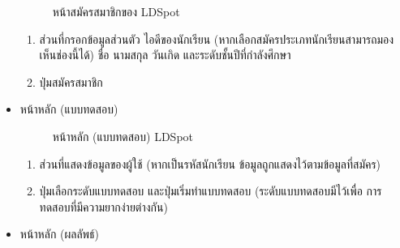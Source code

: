 \documentclass[12pt,oneside,openright,a4paper]{cpe-thai-project}
\begin{document}
\begin{itemize}
\begin{figure}[!ht]
    \caption{หน้าสมัครสมาชิกของ LDSpot}\label{fig:register3}
  \end{figure}
  \begin{enumerate}
    \item ส่วนที่กรอกข้อมูลส่วนตัว ไอดีของนักเรียน (หากเลือกสมัครประเภทนักเรียนสามารถมองเห็นช่องนี้ได้) ชื่อ นามสกุล วันเกิด และระดับชั้นปีที่กำลังศึกษา
    \item ปุ่มสมัครสมาชิก
  \end{enumerate}
  \newpage
 

  \item หน้าหลัก (แบบทดสอบ)
  \begin{figure}[!ht]\centering
    \setlength{\fboxrule}{0.2mm} %
    \setlength{\fboxsep}{1cm}
    \caption{หน้าหลัก (แบบทดสอบ) LDSpot}\label{fig:system}
  \end{figure}
  \begin{enumerate}
    \item ส่วนที่แสดงข้อมูลของผู้ใช้ (หากเป็นรหัสนักเรียน ข้อมูลถูกแสดงไว้ตามข้อมูลที่สมัคร)
    \item ปุ่มเลือกระดับแบบทดสอบ และปุ่มเริ่มทำแบบทดสอบ (ระดับแบบทดสอบมีไว้เพื่อ การทดสอบที่มีความยากง่ายต่างกัน)
  \end{enumerate}
  \newpage
  \item หน้าหลัก (ผลลัพธ์)
  \begin{figure}[!ht]\centering
    \setlength{\fboxrule}{0.2mm} %
    \setlength{\fboxsep}{1cm}

\end{figure}
\end{itemize}
\end{document}

